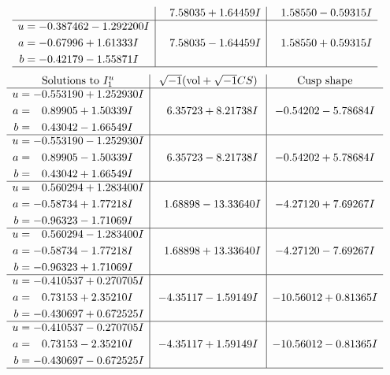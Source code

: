 \documentclass[1p]{elsarticle_modified}
\theoremstyle{definition}
\newcommand{\I}{\sqrt{-1}}
\begin{document}
$$\begin{array}{c|c|c}
 & \phantom{-}7.58035 + 1.64459 I & \phantom{-}1.58550 - 0.59315 I \\ \hline\begin{aligned}
u &= -0.387462 - 1.292200 I \\
a &= -0.67996 + 1.61333 I \\
b &= -0.42179 - 1.55871 I\end{aligned}
 & \phantom{-}7.58035 - 1.64459 I & \phantom{-}1.58550 + 0.59315 I\\
 \hline 
 \end{array}$$\newpage$$\begin{array}{c|c|c}  
\text{Solutions to }I^u_{1}& \I (\text{vol} + \sqrt{-1}CS) & \text{Cusp shape}\\
 \hline 
\begin{aligned}
u &= -0.553190 + 1.252930 I \\
a &= \phantom{-}0.89905 + 1.50339 I \\
b &= \phantom{-}0.43042 - 1.66549 I\end{aligned}
 & \phantom{-}6.35723 + 8.21738 I & -0.54202 - 5.78684 I \\ \hline\begin{aligned}
u &= -0.553190 - 1.252930 I \\
a &= \phantom{-}0.89905 - 1.50339 I \\
b &= \phantom{-}0.43042 + 1.66549 I\end{aligned}
 & \phantom{-}6.35723 - 8.21738 I & -0.54202 + 5.78684 I \\ \hline\begin{aligned}
u &= \phantom{-}0.560294 + 1.283400 I \\
a &= -0.58734 + 1.77218 I \\
b &= -0.96323 - 1.71069 I\end{aligned}
 & \phantom{-}1.68898 - 13.33640 I & -4.27120 + 7.69267 I \\ \hline\begin{aligned}
u &= \phantom{-}0.560294 - 1.283400 I \\
a &= -0.58734 - 1.77218 I \\
b &= -0.96323 + 1.71069 I\end{aligned}
 & \phantom{-}1.68898 + 13.33640 I & -4.27120 - 7.69267 I \\ \hline\begin{aligned}
u &= -0.410537 + 0.270705 I \\
a &= \phantom{-}0.73153 + 2.35210 I \\
b &= -0.430697 + 0.672525 I\end{aligned}
 & -4.35117 - 1.59149 I & -10.56012 + 0.81365 I \\ \hline\begin{aligned}
u &= -0.410537 - 0.270705 I \\
a &= \phantom{-}0.73153 - 2.35210 I \\
b &= -0.430697 - 0.672525 I\end{aligned}
 & -4.35117 + 1.59149 I & -10.56012 - 0.81365 I\\
 \hline 
 \end{array}$$\newpage\newpage\renewcommand{\arraystretch}{1}
\end{document}
